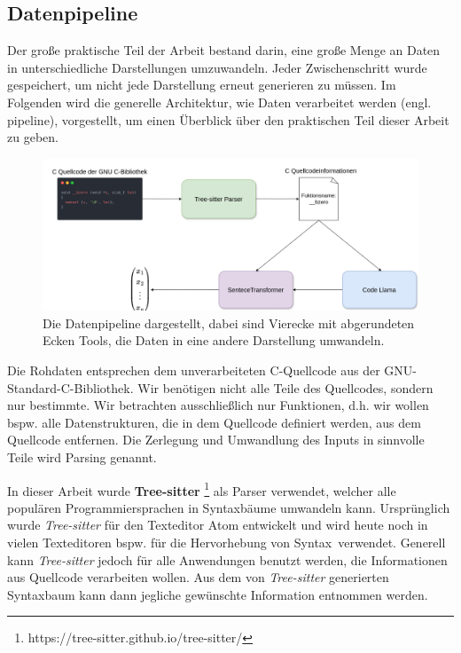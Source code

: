\documentclass[12pt,letterpaper,ngerman]{article}
\begin{document}
\subsection{Datenpipeline}
Der große praktische Teil der Arbeit bestand darin, eine große 
Menge an Daten in unterschiedliche Darstellungen umzuwandeln. 
Jeder Zwischenschritt wurde gespeichert, um nicht jede Darstellung 
erneut generieren zu müssen. Im Folgenden wird die generelle Architektur,
wie Daten verarbeitet werden (engl. pipeline), vorgestellt, um einen 
Überblick über den praktischen Teil dieser Arbeit zu geben.
\begin{figure}[H]
  \begin{center}
    \includegraphics[scale=0.35]{abb/data-pipeline-2.drawio.png}
  \end{center}
  \caption{
    Die Datenpipeline dargestellt, dabei 
    sind Vierecke mit abgerundeten Ecken Tools, die Daten in eine 
    andere Darstellung umwandeln.
  }
\end{figure}

Die Rohdaten entsprechen dem unverarbeiteten 
C-Quellcode aus der GNU-Standard-C-Bibliothek. 
Wir benötigen nicht alle Teile des Quellcodes, sondern nur bestimmte.
Wir betrachten ausschließlich nur Funktionen, d.h. wir wollen
bspw. alle Datenstrukturen, die in dem Quellcode definiert werden,
aus dem Quellcode entfernen. Die Zerlegung und Umwandlung des
Inputs in sinnvolle Teile wird Parsing genannt.

In dieser Arbeit wurde {\bf Tree-sitter} 
\footnote{https://tree-sitter.github.io/tree-sitter/} als 
Parser verwendet, welcher
alle populären Programmiersprachen in Syntaxbäume umwandeln kann.
Ursprünglich wurde \textit{Tree-sitter} für den Texteditor Atom
entwickelt und wird heute noch in vielen Texteditoren bspw. 
für die Hervorhebung von Syntax verwendet. Generell kann 
\textit{Tree-sitter} jedoch
für alle Anwendungen benutzt werden, die Informationen aus Quellcode
verarbeiten wollen. Aus dem von \textit{Tree-sitter} generierten
Syntaxbaum kann dann jegliche gewünschte Information entnommen 
werden.
\end{document}
